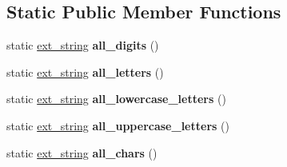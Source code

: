 \subsection*{Static Public Member Functions}
\begin{DoxyCompactItemize}
\item 
\hypertarget{classstrtk_1_1ext__string_a8a219b9138f11bbae3e8dce696676de2}{static \hyperlink{classstrtk_1_1ext__string}{ext\-\_\-string} {\bfseries all\-\_\-digits} ()}\label{classstrtk_1_1ext__string_a8a219b9138f11bbae3e8dce696676de2}

\item 
\hypertarget{classstrtk_1_1ext__string_a1fcfcfb44b6ea63449a6791b53c6a455}{static \hyperlink{classstrtk_1_1ext__string}{ext\-\_\-string} {\bfseries all\-\_\-letters} ()}\label{classstrtk_1_1ext__string_a1fcfcfb44b6ea63449a6791b53c6a455}

\item 
\hypertarget{classstrtk_1_1ext__string_ac8cd09014f4be0a655aa036e455eef12}{static \hyperlink{classstrtk_1_1ext__string}{ext\-\_\-string} {\bfseries all\-\_\-lowercase\-\_\-letters} ()}\label{classstrtk_1_1ext__string_ac8cd09014f4be0a655aa036e455eef12}

\item 
\hypertarget{classstrtk_1_1ext__string_ab58ebb5fd1a442a5119095de35c6b86f}{static \hyperlink{classstrtk_1_1ext__string}{ext\-\_\-string} {\bfseries all\-\_\-uppercase\-\_\-letters} ()}\label{classstrtk_1_1ext__string_ab58ebb5fd1a442a5119095de35c6b86f}

\item 
\hypertarget{classstrtk_1_1ext__string_a598f8cd0af2e6ce0578d92d4e216b312}{static \hyperlink{classstrtk_1_1ext__string}{ext\-\_\-string} {\bfseries all\-\_\-chars} ()}\label{classstrtk_1_1ext__string_a598f8cd0af2e6ce0578d92d4e216b312}

\end{DoxyCompactItemize}
